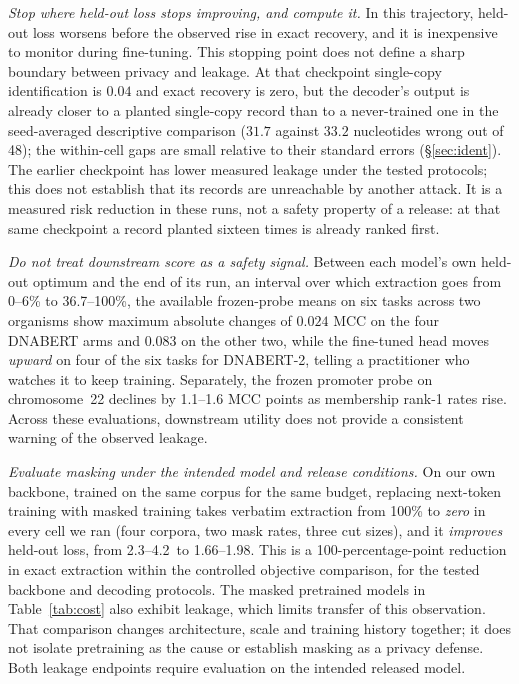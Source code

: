 \emph{Stop where held-out loss stops improving, and compute it.} In this trajectory, held-out loss worsens before the observed rise in exact
recovery, and it is inexpensive to monitor during fine-tuning. This stopping point does not define a sharp boundary between privacy and leakage. At that checkpoint single-copy identification is $0.04$ and exact recovery is zero,
but the decoder's output is already closer to a planted single-copy record than to a never-trained
one in the seed-averaged descriptive comparison ($31.7$ against $33.2$ nucleotides
wrong out of 48); the within-cell gaps are small relative to their standard errors
(\S\ref{sec:ident}). The earlier checkpoint has lower measured leakage under the tested protocols;
this does not establish that its records are unreachable by another attack. It is a measured
risk reduction in these runs, not a safety property of a release: at that same checkpoint a
record planted sixteen times is already ranked first.

\emph{Do not treat downstream score as a safety signal.} Between each model's own held-out optimum
and the end of its run, an interval over which extraction goes from 0--6\% to 36.7--100\%, the available frozen-probe means
on six tasks across two organisms show maximum absolute changes of $0.024$ MCC on the four DNABERT
arms and $0.083$ on the other two, while the fine-tuned head moves \emph{upward}
on four of the six tasks for DNABERT-2, telling a practitioner who watches it to keep training.
Separately, the frozen promoter probe on chromosome~22 declines by 1.1--1.6 MCC points
as membership rank-1 rates rise. Across these evaluations, downstream utility does not provide
a consistent warning of the observed leakage.

\emph{Evaluate masking under the intended model and release conditions.} On our own
backbone, trained on the same corpus for the same budget, replacing next-token training with masked
training takes verbatim extraction from 100\% to \emph{zero} in every cell we ran (four corpora,
two mask rates, three cut sizes), and it \emph{improves} held-out loss, from 2.3--4.2\,\bits{} to
1.66--1.98. This is a 100-percentage-point reduction in exact extraction within the
controlled objective comparison, for the tested backbone and decoding protocols.
The masked pretrained models in Table~\ref{tab:cost} also exhibit leakage, which limits
transfer of this observation. That comparison changes architecture, scale and training
history together; it does not isolate pretraining as the cause or establish masking as
a privacy defense. Both leakage endpoints require evaluation on the intended released model.

